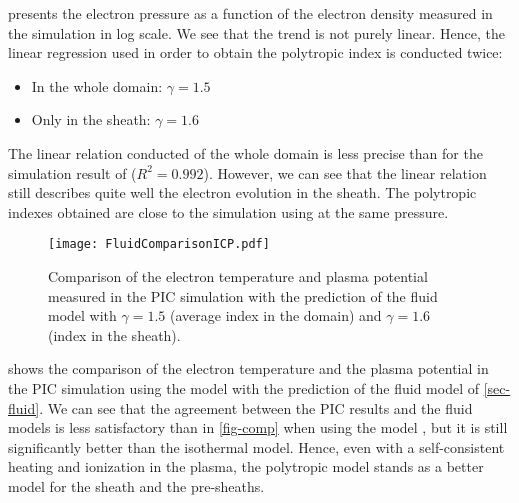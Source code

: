  presents the electron pressure as a function of the electron density measured in the simulation in log scale.
We see that the trend is not purely linear. Hence, the linear regression used in order to obtain the polytropic index is conducted twice\string:
\begin{itemize}
  \item In the whole domain\string: $\gamma=1.5$
  \item Only in the sheath\string: $\gamma=1.6$
\end{itemize}
The linear relation conducted of the whole domain is less precise than for the simulation result of  ($R^2=0.992$).
However, we can see that the linear relation still describes quite well the electron evolution in the sheath.
The polytropic indexes obtained are close to the simulation using  at the same pressure.

\begin{figure}[!htbp]
  \centering
  \texttt{[image: FluidComparisonICP.pdf]}
  \caption{Comparison of the electron temperature and plasma potential measured in the PIC simulation with the prediction of the fluid model with $\gamma = 1.5$ (average index in the domain) and $\gamma=1.6$ (index in the sheath).}
  \label{fig-comp2}
\end{figure}

 shows the comparison of the electron temperature and the plasma potential in the PIC simulation using the model   with the prediction of the fluid model of \cref{sec-fluid}.
We can see that the agreement between the PIC results and the fluid models is less satisfactory than in \cref{fig-comp} when using the model , but it is still significantly better than the isothermal model.
Hence, even with a self-consistent heating and ionization in the plasma, the polytropic model stands as a better model for the sheath and the pre-sheaths.
